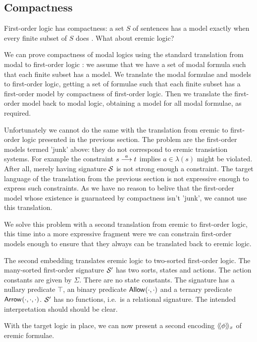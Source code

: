 \subsection{Compactness}

\NI First-order logic has compactness: a set $S$ of sentences has a
model exactly when every finite subset of $S$ does \cite[Chapter
  4.3]{EndertonHB:matinttl}. What about eremic logic? 

We can prove compactness of modal logics using the standard
translation from modal to first-order logic \cite{BlackburnP:modlog}:
we assume that we have a set of modal formula such that each finite
subset has a model. We translate the modal formulae and models to
first-order logic, getting a set of formulae such that each finite
subset has a first-order model by compactness of first-order
logic. Then we translate the first-order model back to modal logic,
obtaining a model for all modal formulae, as required.

Unfortunately we cannot do the same with the translation from eremic
to first-order logic presented in the previous section. The problem
are the first-order models termed 'junk' above: they do not correspond
to eremic transistion systems.  For example the constraint $s
\stackrel{a}{\longrightarrow} t$ implies $a \in \lambda(s)$ might be violated. After all,
merely having signature $\mathcal{S}$ is not strong enough a constraint. The
target language of the translation from the previous section is not
expressive enough to express such constraints.  As we have no reason
to belive that the first-order model whose existence is guarnateed by
compactness isn't 'junk', we cannot use this translation.

We solve this problem with a second translation from eremic to
first-order logic, this time into a more expressive fragment were we
can constrain first-order models enough to ensure that they always can
be translated back to eremic logic.

The second embedding translates eremic logic to two-sorted first-order
logic. The many-sorted first-order signature $\mathcal{S}'$ has two sorts,
states and actions. The action constants are given by $\Sigma$. There
are no state constants. The signature has a nullary predicate $\top$,
an binary predicate $\mathsf{Allow}^{}(\cdot, \cdot)$ and a ternary predicate
$\mathsf{Arrow}^{}(\cdot, \cdot, \cdot)$.  $\mathcal{S}'$ has no functions, i.e.~is
a relational signature.  The intended interpretation should should be
clear.

With the target logic in place, we can now present a second encoding
$\langle\!\langle \phi \rangle\!\rangle_x$ of eremic formulae.

